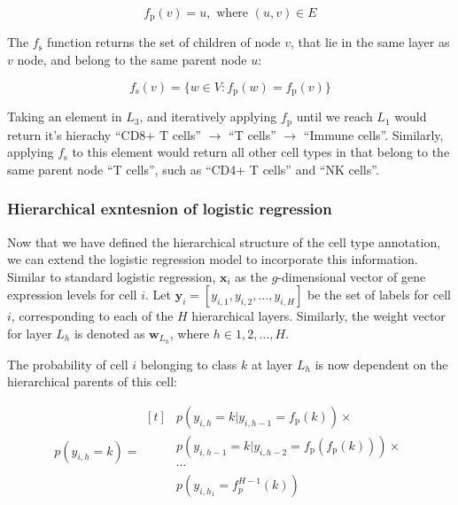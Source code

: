 \begin{equation}
    f_{\text{p}}(v) = u, \text{ where } (u, v) \in E
\end{equation}

The $f_{\text{s}}$ function returns the set of children of node $v$, that lie in the same layer as $v$ node, and belong to the same parent node $u$:

\begin{equation}
    f_{\text{s}}(v) = \{w \in V : f_{\text{p}}(w) = f_{\text{p}}(v)\}
\end{equation}

Taking an element in $L_3$, and iteratively applying $f_{\text{p}}$ until we reach $L_1$  would return it's hierachy ``CD8+ T cells'' $\rightarrow$ ``T cells'' $\rightarrow$ ``Immune cells''. Similarly, applying $f_{\text{s}}$ to this element would return all other cell types in that belong to the same parent node ``T cells'', such as ``CD4+ T cells'' and ``NK cells''.

\subsubsection*{Hierarchical exntesnion of logistic regression}

Now that we have defined the hierarchical structure of the cell type annotation, we can extend the logistic regression model to incorporate this information. Similar to standard logistic regression, $\mathbf{x}_i$ as the $g$-dimensional vector of gene expression levels for cell $i$. Let $\mathbf{y}_i = [y_{i,1}, y_{i,2}, \ldots, y_{i,H}]$ be the set of labels for cell $i$, corresponding to each of the $H$ hierarchical layers. Similarly, the weight vector for layer $L_h$ is denoted as $\mathbf{w}_{L_h}$, where $h \in {1, 2, \ldots, H}$.

The probability of cell $i$ belonging to class $k$ at layer $L_h$ is now dependent on the hierarchical parents of this cell:

\begin{equation}
    p(y_{i,h} = k) = \begin{aligned}[t]
        & p(y_{i,h} = k | y_{i,h-1} = f_{\text{p}}(k)) \times \\
        & p(y_{i,h-1} = k | y_{i,h-2} = f_{\text{p}}(f_{\text{p}}(k))) \times \\
        & \cdots \\
        & p(y_{i,h_1} = f_{p}^{H-1}(k))
    \end{aligned}
\end{equation}

